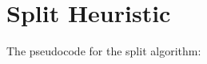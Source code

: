 


\section{Split Heuristic} %
\label{sec:split_heuristic}

The pseudocode for the split algorithm:

